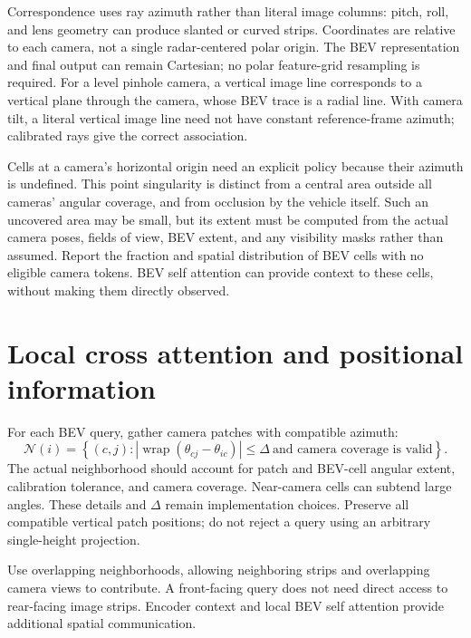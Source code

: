 \documentclass[11pt,a4paper]{article}
\begin{document}
Correspondence uses ray azimuth rather than literal image columns: pitch, roll, and lens geometry can produce slanted or curved strips. Coordinates are relative to each camera, not a single radar-centered polar origin. The BEV representation and final output can remain Cartesian; no polar feature-grid resampling is required. For a level pinhole camera, a vertical image line corresponds to a vertical plane through the camera, whose BEV trace is a radial line. With camera tilt, a literal vertical image line need not have constant reference-frame azimuth; calibrated rays give the correct association.

Cells at a camera's horizontal origin need an explicit policy because their azimuth is undefined. This point singularity is distinct from a central area outside all cameras' angular coverage, and from occlusion by the vehicle itself. Such an uncovered area may be small, but its extent must be computed from the actual camera poses, fields of view, BEV extent, and any visibility masks rather than assumed. Report the fraction and spatial distribution of BEV cells with no eligible camera tokens. BEV self attention can provide context to these cells, without making them directly observed.

\section{Local cross attention and positional information}
For each BEV query, gather camera patches with compatible azimuth:
\begin{equation}
 \mathcal N(i)=\left\{(c,j):
 |\operatorname{wrap}(\theta_{cj}-\theta_{ic})|\leq\Delta
 \ \text{and camera coverage is valid}\right\}.
\end{equation}
The actual neighborhood should account for patch and BEV-cell angular extent, calibration tolerance, and camera coverage. Near-camera cells can subtend large angles. These details and $\Delta$ remain implementation choices. Preserve all compatible vertical patch positions; do not reject a query using an arbitrary single-height projection.

Use overlapping neighborhoods, allowing neighboring strips and overlapping camera views to contribute. A front-facing query does not need direct access to rear-facing image strips. Encoder context and local BEV self attention provide additional spatial communication.
\end{document}
